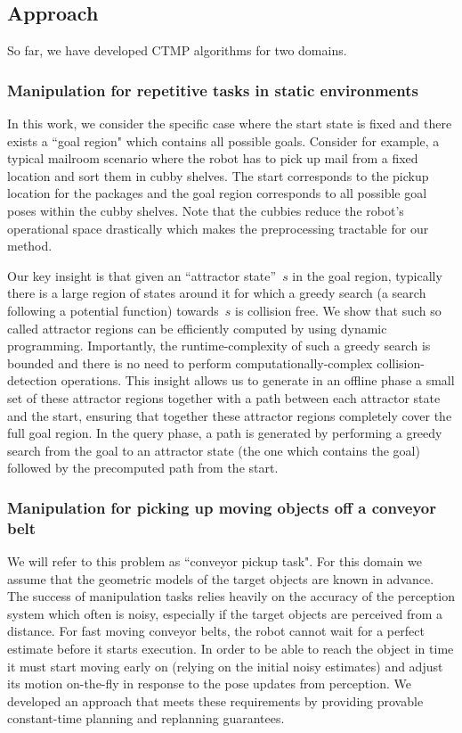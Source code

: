 \documentclass[a4paper,10pt]{article}
\begin{document}
\subsection{Approach}
\label{sec:approach}
So far, we have developed CTMP algorithms for two domains.
\subsubsection{Manipulation for repetitive tasks in static environments}
In this work, we consider the specific case where the start state is fixed and there exists a ``goal region" which contains all possible goals. Consider for example, a typical mailroom scenario where the robot has to pick up mail from a fixed location and sort them in cubby shelves. The start corresponds to the pickup location for the packages and the goal region corresponds to all possible goal poses within the cubby shelves. Note that the cubbies reduce the robot's operational space drastically which makes the preprocessing tractable for our method.

Our key insight is that given an ``attractor state''~$s$ in the goal region, typically there is a large region of states around it for which a greedy search (a search following a potential function) towards~$s$ is collision free. We show that such so called attractor regions can be efficiently computed by using dynamic programming.
Importantly, the runtime-complexity of such a greedy search is bounded and there is no need to perform computationally-complex collision-detection operations. 
This insight allows us to generate in an offline phase a small set of these attractor regions together with a path between each attractor state and the start, ensuring that together these attractor regions completely cover the full goal region.
In the query phase, a path is generated by performing a greedy search from the goal to an attractor state (the one which contains the goal) followed by the precomputed path from the start.

\subsubsection{Manipulation for picking up moving objects off a conveyor belt}
We will refer to this problem as ``conveyor pickup task". For this domain we assume that the geometric models of the target objects are known in advance. The success of manipulation tasks relies heavily on the accuracy of the perception system which often is noisy, especially if the target objects are perceived from a distance. For fast moving conveyor belts, the robot cannot wait for a perfect estimate before it starts execution. In order to be able to reach the object in time it must start moving early on (relying on the initial noisy estimates) and adjust its motion on-the-fly in response to the pose updates from perception. We developed an approach that meets these requirements by providing provable constant-time planning and replanning guarantees.
\end{document}
